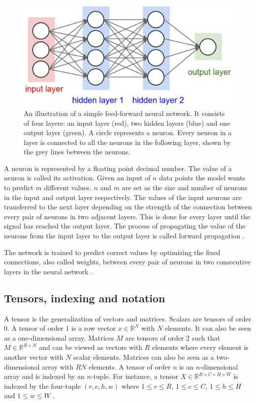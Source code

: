 \documentclass[a4paper, twoside]{article}
\begin{document}
\begin{figure}[h]
	\centering
  		\includegraphics[scale=1]{feedforward.png}
  	\caption{An illustration \cite{hidden12} of a simple feed-forward neural network. It consists of four layers: an input layer (red), two hidden layers (blue) and one output layer (green). A circle represents a neuron. Every neuron in a layer is connected to all the neurons in the following layer, shown by the grey lines between the neurons. } \label{figfeedforward}
\end{figure}

A neuron is represented by a floating point decimal number. The value of a neuron is called its activation. Given an input of $n$ data points the model wants to predict $m$ different values. $n$ and $m$ are set as the size and number of neurons in the input and output layer respectively. The values of the input neurons are transferred to the next layer depending on the strength of the connection between every pair of neurons in two adjacent layers. This is done for every layer until the signal has reached the output layer. The process of propagating the value of the neurons from the input layer to the output layer is called forward propagation \cite{cs231n}.

The network is trained to predict correct values by optimizing the fixed connections, also called weights, between every pair of neurons in two consecutive layers in the neural network \cite{cs231n}.

\subsection{Tensors, indexing and notation}
A tensor is the generalization of vectors and matrices. Scalars are tensors of order 0. A tensor of order 1 is a row vector $x \in \mathbb{R}^N$ with $N$ elements. It can also be seen as a one-dimensional array. Matrices $M$ are tensors of order 2 such that $M \in \mathbb{R}^{R \times N}$ and can be viewed as vectors with $R$ elements where every element is another vector with $N$ scalar elements. Matrices can also be seen as a two-dimensional array with $RN$ elements. A tensor of order $n$ is an $n$-dimensional array and is indexed by an $n$-tuple. For instance, a tensor $X \in \mathbb{R}^{R \times C \times H \times W}$ is indexed by the four-tuple $(r,c,h,w)$ where $1 \leq r \leq R$, $1 \leq c \leq C$, $1 \leq h \leq H$ and $1 \leq w \leq W$ \cite{cs231n}.
\end{document}

